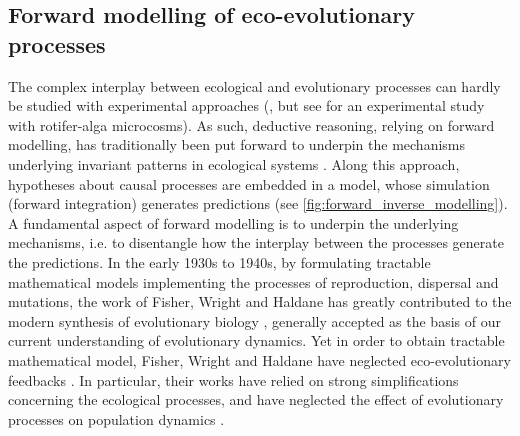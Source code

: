 \subsection{Forward modelling of eco-evolutionary processes}
The complex interplay between ecological and evolutionary processes can hardly be studied with experimental approaches (\cite{Pontarp2019,Hagen2022}, but see \cite{Becks2012} for an experimental study with rotifer-alga microcosms). 
As such, deductive reasoning, relying on forward modelling, has traditionally been put forward to underpin the mechanisms underlying invariant patterns in ecological systems \citep{Brummitt2020}. Along this approach, hypotheses about causal processes are embedded in a model, whose simulation (forward integration) generates predictions (see \cref{fig:forward_inverse_modelling}). A fundamental aspect of forward modelling is to underpin the underlying mechanisms, i.e. to disentangle how the interplay between the processes generate the predictions. 
% 
% 
In the early 1930s to 1940s, by formulating tractable mathematical models implementing the processes of reproduction, dispersal and mutations, the work of Fisher, Wright and Haldane has greatly contributed to the modern synthesis of evolutionary biology \citep{huxley1942evolution}, generally accepted as the basis of our current understanding of evolutionary dynamics. 
% 
% 
Yet in order to obtain tractable mathematical model, Fisher, Wright and Haldane have neglected eco-evolutionary feedbacks \citep{Govaert2019}. In particular, their works have relied on strong simplifications concerning the ecological processes, and have neglected the effect of evolutionary processes on population dynamics \citep{Lion2022}.

